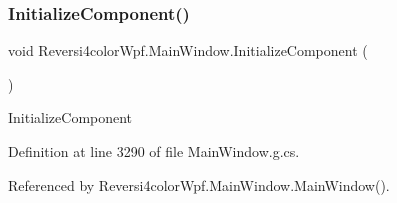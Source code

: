 \subsubsection{\texorpdfstring{Initialize\+Component()}{InitializeComponent()}\hspace{0.1cm}{\footnotesize\ttfamily [3/4]}}
{\footnotesize\ttfamily void Reversi4color\+Wpf.\+Main\+Window.\+Initialize\+Component (\begin{DoxyParamCaption}{ }\end{DoxyParamCaption})}



Initialize\+Component 



Definition at line 3290 of file Main\+Window.\+g.\+cs.



Referenced by Reversi4color\+Wpf.\+Main\+Window.\+Main\+Window().

